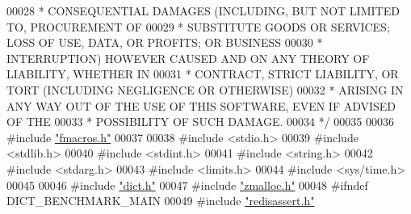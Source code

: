 \begin{DoxyCode}
00028 \textcolor{comment}{ * CONSEQUENTIAL DAMAGES (INCLUDING, BUT NOT LIMITED TO, PROCUREMENT OF}
00029 \textcolor{comment}{ * SUBSTITUTE GOODS OR SERVICES; LOSS OF USE, DATA, OR PROFITS; OR BUSINESS}
00030 \textcolor{comment}{ * INTERRUPTION) HOWEVER CAUSED AND ON ANY THEORY OF LIABILITY, WHETHER IN}
00031 \textcolor{comment}{ * CONTRACT, STRICT LIABILITY, OR TORT (INCLUDING NEGLIGENCE OR OTHERWISE)}
00032 \textcolor{comment}{ * ARISING IN ANY WAY OUT OF THE USE OF THIS SOFTWARE, EVEN IF ADVISED OF THE}
00033 \textcolor{comment}{ * POSSIBILITY OF SUCH DAMAGE.}
00034 \textcolor{comment}{ */}
00035 
00036 \textcolor{preprocessor}{#}\textcolor{preprocessor}{include} \hyperlink{fmacros_8h}{"fmacros.h"}
00037 
00038 \textcolor{preprocessor}{#}\textcolor{preprocessor}{include} \textcolor{preprocessor}{<}\textcolor{preprocessor}{stdio}\textcolor{preprocessor}{.}\textcolor{preprocessor}{h}\textcolor{preprocessor}{>}
00039 \textcolor{preprocessor}{#}\textcolor{preprocessor}{include} \textcolor{preprocessor}{<}\textcolor{preprocessor}{stdlib}\textcolor{preprocessor}{.}\textcolor{preprocessor}{h}\textcolor{preprocessor}{>}
00040 \textcolor{preprocessor}{#}\textcolor{preprocessor}{include} \textcolor{preprocessor}{<}\textcolor{preprocessor}{stdint}\textcolor{preprocessor}{.}\textcolor{preprocessor}{h}\textcolor{preprocessor}{>}
00041 \textcolor{preprocessor}{#}\textcolor{preprocessor}{include} \textcolor{preprocessor}{<}\textcolor{preprocessor}{string}\textcolor{preprocessor}{.}\textcolor{preprocessor}{h}\textcolor{preprocessor}{>}
00042 \textcolor{preprocessor}{#}\textcolor{preprocessor}{include} \textcolor{preprocessor}{<}\textcolor{preprocessor}{stdarg}\textcolor{preprocessor}{.}\textcolor{preprocessor}{h}\textcolor{preprocessor}{>}
00043 \textcolor{preprocessor}{#}\textcolor{preprocessor}{include} \textcolor{preprocessor}{<}\textcolor{preprocessor}{limits}\textcolor{preprocessor}{.}\textcolor{preprocessor}{h}\textcolor{preprocessor}{>}
00044 \textcolor{preprocessor}{#}\textcolor{preprocessor}{include} \textcolor{preprocessor}{<}\textcolor{preprocessor}{sys}\textcolor{preprocessor}{/}\textcolor{preprocessor}{time}\textcolor{preprocessor}{.}\textcolor{preprocessor}{h}\textcolor{preprocessor}{>}
00045 
00046 \textcolor{preprocessor}{#}\textcolor{preprocessor}{include} \hyperlink{dict_8h}{"dict.h"}
00047 \textcolor{preprocessor}{#}\textcolor{preprocessor}{include} \hyperlink{zmalloc_8h}{"zmalloc.h"}
00048 \textcolor{preprocessor}{#}\textcolor{preprocessor}{ifndef} \textcolor{preprocessor}{DICT\_BENCHMARK\_MAIN}
00049 \textcolor{preprocessor}{#}\textcolor{preprocessor}{include} \hyperlink{redisassert_8h}{"redisassert.h"}

\end{DoxyCode}
